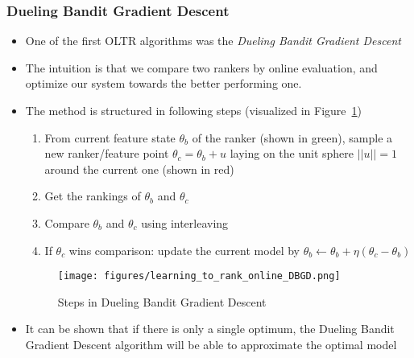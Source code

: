 \subsubsection{Dueling Bandit Gradient Descent}
\begin{itemize}
	\item One of the first OLTR algorithms was the \textit{Dueling Bandit Gradient Descent}
	\item The intuition is that we compare two rankers by online evaluation, and optimize our system towards the better performing one.
	\item The method is structured in following steps (visualized in Figure~\ref{img:learning_to_rank_online_DBGD})
	\begin{enumerate}
		\item From current feature state $\theta_b$ of the ranker (shown in green), sample a new ranker/feature point $\theta_c = \theta_b + u$ laying on the unit sphere $||u||=1$ around the current one (shown in red)
		\item Get the rankings of $\theta_b$ and $\theta_c$
		\item Compare $\theta_b$ and $\theta_c$ using interleaving
		\item If $\theta_c$ wins comparison: update the current model by $\theta_b \leftarrow \theta_b + \eta (\theta_c - \theta_b)$
	\end{enumerate}
	\begin{figure}[ht]
		\centering
		\texttt{[image: figures/learning\_to\_rank\_online\_DBGD.png]}
		\caption{Steps in Dueling Bandit Gradient Descent}
		\label{img:learning_to_rank_online_DBGD}
	\end{figure}
	\item It can be shown that if there is only a single optimum, the Dueling Bandit Gradient Descent algorithm will be able to approximate the optimal model
\end{itemize}